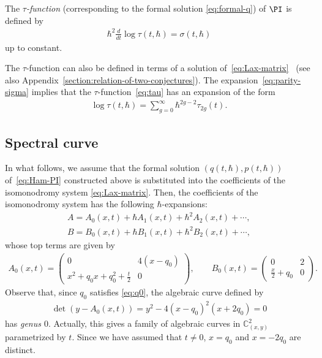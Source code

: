\begin{Def}  \label{def:tau-function}
The {\em $\tau$-function}
(corresponding to the formal solution \eqref{eq:formal-q})
of $\PI$ is def\/ined by
\begin{gather} \label{eq:tau}
\hbar^{2} \frac{d}{dt} \log \tau(t,\hbar) = \sigma(t,\hbar)
\end{gather}
up to constant.
\end{Def}

The $\tau$-function can also be def\/ined in terms of
a solution of~\eqref{eq:Lax-matrix}~\cite{JMU} (see also
Appendix~\ref{section:relation-of-two-conjectures}).
The expansion~\eqref{eq:parity-sigma} implies that the $\tau$-function~\eqref{eq:tau} has an expansion of the form
\begin{gather*} %
\log \tau(t,\hbar) = \sum_{g=0}^{\infty} \hbar^{2g-2} \tau_{2g}(t).
\end{gather*} %

\subsection{Spectral curve}

In what follows, we assume that the formal solution
$(q(t,\hbar), p(t,\hbar))$ of~\eqref{eq:Ham-PI}
constructed above is substituted into the coef\/f\/icients
of the isomonodromy system \eqref{eq:Lax-matrix}.
Then, the coef\/f\/icients of the isomonodromy system has the following
$\hbar$-expansions:
\begin{gather*}
A   =   A_{0}(x,t) + \hbar A_{1}(x,t) + \hbar^{2} A_{2}(x,t) + \cdots, \\
B   =   B_{0}(x,t) + \hbar B_{1}(x,t) + \hbar^{2} B_{2}(x,t) + \cdots,
\end{gather*}
whose top terms are given by
\begin{gather*}
A_{0}(x,t)   =
\begin{pmatrix}
  0
&
 4(x-q_{0})
\\
\displaystyle x^{2} + q_{0} x + q_{0}^{2} + \frac{t}{2}
&
  0
\end{pmatrix}, \qquad
B_{0}(x,t)    =
\begin{pmatrix}
  0
&
  2
\\
\displaystyle \frac{x}{2}+q_{0}
&
   0
\end{pmatrix}.
\end{gather*}
Observe that, since $q_{0}$ satisf\/ies \eqref{eq:q0},
the algebraic curve def\/ined by
\begin{gather} \label{eq:sp-curve}
\det  (y - A_{0}(x,t)  ) =
y^{2} - 4  ( x-q_{0}  )^{2}  ( x+2q_{0}  )
= 0
\end{gather}
has {\em genus $0$}. Actually, this gives a family of algebraic
curves in ${\mathbb C}^{2}_{(x,y)}$
parametrized by $t$. Since we have assumed that
$t \ne 0$, $x=q_{0}$ and $x=-2q_{0}$ are distinct.

